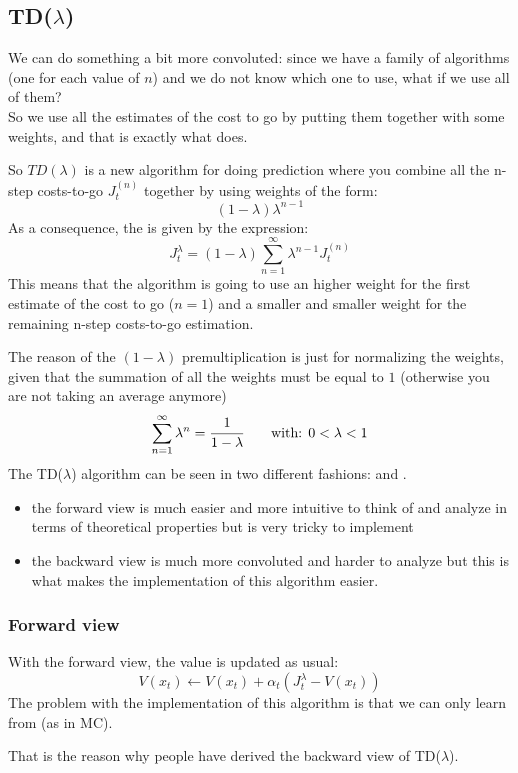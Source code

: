 \subsection{TD($\lambda$)}
We can do something a bit more convoluted: since we have a family of algorithms (one for each value of $n$) and we do not know which one to use, what if we use all of them?\\
So we use all the estimates of the cost to go by putting them together with some weights, and that is exactly what  does.

So $TD(\lambda)$ is a new algorithm for doing prediction where you combine all the n-step costs-to-go $J_t^{(n)}$ together by using weights of the form:
\[(1-\lambda)\lambda^{n-1}\]
As a consequence, the  is given by the expression:
\[J_t^{\lambda} = (1-\lambda) \sum_{n=1}^{\infty} \lambda^{n-1} J_t^{(n)}\]
This means that the algorithm is going to use an higher weight for the first estimate of the cost to go ($n=1$) and a smaller and smaller weight for the remaining n-step costs-to-go estimation.

The reason of the $(1-\lambda)$ premultiplication is just for normalizing the weights, given that the summation of all the weights must be equal to $1$ (otherwise you are not taking an average anymore)
\[\sum_{n=1}^{\infty}\lambda^n = \cfrac{1}{1-\lambda}\qquad \text{with: }0<\lambda<1\]
The TD($\lambda$) algorithm can be seen in two different fashions:  and .
\begin{itemize}
\item the forward view is much easier and more intuitive to think of and analyze in terms of theoretical properties but is very tricky to implement
\item the backward view is much more convoluted and harder to analyze but this is what makes the implementation of this algorithm easier.
\end{itemize}

\subsubsection{Forward view}
With the forward view, the value is updated as usual:
\[V(x_t)\leftarrow V(x_t) + \alpha_t (J_t^{\lambda} - V(x_t))\]
The problem with the implementation of this algorithm is that we can only learn from  (as in MC).

That is the reason why people have derived the backward view of TD($\lambda$).
 
